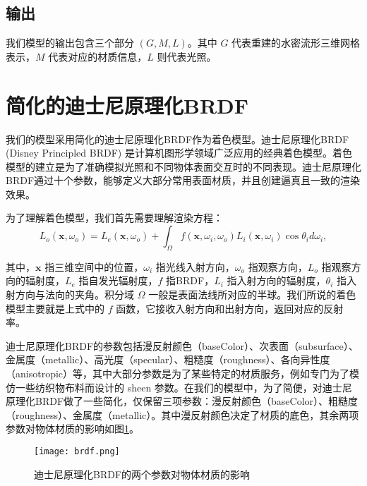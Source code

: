 \subsection{输出}
我们模型的输出包含三个部分 $(G, M, L)$。其中 $G$ 代表重建的水密流形三维网格表示，$M$ 代表对应的材质信息，$L$ 则代表光照。

\section{简化的迪士尼原理化BRDF}

我们的模型采用简化的迪士尼原理化BRDF作为着色模型。迪士尼原理化BRDF (Disney Principled BRDF) \cite{DisneyBRDF} 是计算机图形学领域广泛应用的经典着色模型。着色模型的建立是为了准确模拟光照和不同物体表面交互时的不同表现。迪士尼原理化BRDF通过十个参数，能够定义大部分常用表面材质，并且创建逼真且一致的渲染效果。

为了理解着色模型，我们首先需要理解渲染方程：
\begin{equation}
  L_{o}\left(\mathbf{x},\omega_{o}\right) =L_{e}\left(\mathbf{x},\omega_{{o}}\right) +\int_{\Omega}f\left(\mathbf{x},\omega_{{i}},\omega_{{o}}\right)L_{i}\left(\mathbf{x},\omega_{{i}}\right)\cos\theta_{i}d\omega_{{i}},
\end{equation}

其中，$\mathbf{x}$ 指三维空间中的位置，$\omega_i$ 指光线入射方向，$\omega_o$ 指观察方向，$L_o$ 指观察方向的辐射度，$L_e$ 指自发光辐射度，$f$ 指BRDF，$L_i$ 指入射方向的辐射度，$\theta_i$ 指入射方向与法向的夹角。积分域 $\Omega$ 一般是表面法线所对应的半球。我们所说的着色模型主要就是上式中的 $f$ 函数，它接收入射方向和出射方向，返回对应的反射率。

迪士尼原理化BRDF的参数包括漫反射颜色（baseColor）、次表面（subsurface）、金属度（metallic）、高光度（specular）、粗糙度（roughness）、各向异性度（anisotropic）等，其中大部分参数是为了某些特定的材质服务，例如专门为了模仿一些纺织物布料而设计的 sheen 参数。在我们的模型中，为了简便，对迪士尼原理化BRDF做了一些简化，仅保留三项参数：漫反射颜色（baseColor）、粗糙度（roughness）、金属度（metallic）。其中漫反射颜色决定了材质的底色，其余两项参数对物体材质的影响如图\ref{fig:brdf}。
\begin{figure}
  \centering
  \texttt{[image: brdf.png]}
  \caption{迪士尼原理化BRDF的两个参数对物体材质的影响}
  \label{fig:brdf}
\end{figure}

